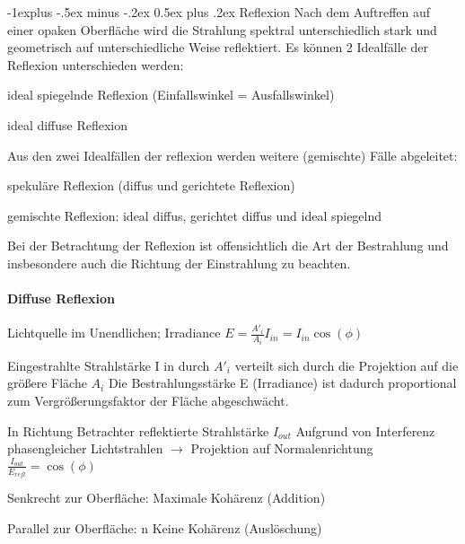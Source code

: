 \documentclass[landscape]{article}
\makeatletter
\renewcommand{\subsection}{\@startsection{subsection}{2}{0mm}%
                                {-1explus -.5ex minus -.2ex}%
                                {0.5ex plus .2ex}%
                                {\normalfont\normalsize\bfseries}}
\makeatother
\begin{document}
\begin{multicols}{3}
  
  \subsection{ Reflexion}
  Nach dem Auftreffen auf einer opaken Oberfläche wird die Strahlung spektral
  unterschiedlich stark und geometrisch auf unterschiedliche Weise reflektiert. Es
  können 2 Idealfälle der Reflexion unterschieden werden:
  \begin{itemize*}
    \item ideal spiegelnde Reflexion (Einfallswinkel = Ausfallswinkel)
    \item ideal diffuse Reflexion
  \end{itemize*}
  
  Aus den zwei Idealfällen der reflexion werden weitere (gemischte) Fälle abgeleitet:
  \begin{itemize*}
    \item spekuläre Reflexion (diffus und gerichtete Reflexion)
    \item gemischte Reflexion: ideal diffus, gerichtet diffus und ideal spiegelnd
  \end{itemize*}
  
  Bei der Betrachtung der Reflexion ist offensichtlich die Art der Bestrahlung und
  insbesondere auch die Richtung der Einstrahlung zu beachten.
  
  \paragraph{Diffuse Reflexion}
  
  Lichtquelle im Unendlichen; Irradiance $E=\frac{A'_i}{A_i}I_{in}=I_{in}\cos(\phi)$
  
  Eingestrahlte Strahlstärke I in durch $A'_i$ verteilt sich durch die Projektion auf die größere Fläche $A_i$ Die Bestrahlungsstärke E (Irradiance) ist dadurch proportional zum Vergrößerungsfaktor der Fläche abgeschwächt.
  
  In Richtung Betrachter reflektierte Strahlstärke $I_{out}$ Aufgrund von Interferenz phasengleicher Lichtstrahlen $\rightarrow$ Projektion auf Normalenrichtung $\frac{I_{out}}{E_{refl}}=\cos(\phi)$
  \begin{itemize*}
    \item Senkrecht zur Oberfläche: Maximale Kohärenz (Addition)
    \item Parallel zur Oberfläche: n Keine Kohärenz (Auslöschung)
  \end{itemize*}
  

\end{multicols}
\end{document}
